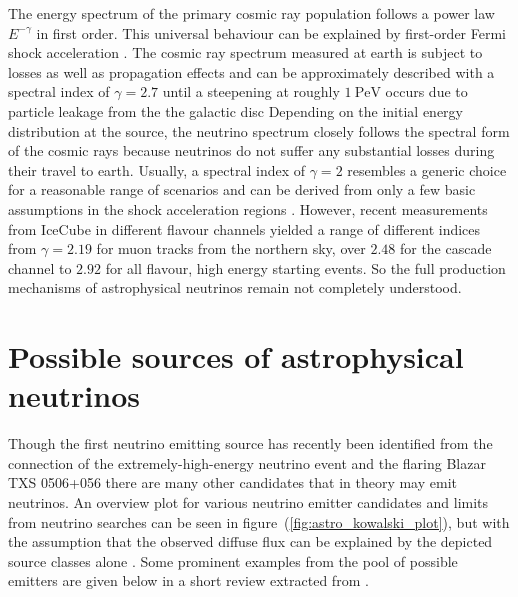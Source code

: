 The energy spectrum of the primary cosmic ray population follows a power law $E^{-\gamma}$ in first order.
This universal behaviour can be explained by first-order Fermi shock acceleration .
The cosmic ray spectrum measured at earth is subject to losses as well as propagation effects and can be approximately described with a spectral index of $\gamma=\num{2.7}$ until a steepening at roughly $\SI{1}{\peta\eV}$ occurs due to particle leakage from the the galactic disc 
Depending on the initial energy distribution at the source, the neutrino spectrum closely follows the spectral form of the cosmic rays because neutrinos do not suffer any substantial losses during their travel to earth.
Usually, a spectral index of $\gamma=2$ resembles a generic choice for a reasonable range of scenarios and can be derived from only a few basic assumptions in the shock acceleration regions .
However, recent measurements from IceCube in different flavour channels yielded a range of different indices from $\gamma=\num{2.19}$  for muon tracks from the northern sky, over $\num{2.48}$  for the cascade channel to $\num{2.92}$  for all flavour, high energy starting events.
So the full production mechanisms of astrophysical neutrinos remain not completely understood.

\section{Possible sources of astrophysical neutrinos}
Though the first neutrino emitting source has recently been identified from the connection of the extremely-high-energy neutrino event and the flaring Blazar TXS 0506+056  there are many other candidates that in theory may emit neutrinos.
An overview plot for various neutrino emitter candidates and limits from neutrino searches can be seen in figure~(\ref{fig:astro_kowalski_plot}), but with the assumption that the observed diffuse flux can be explained by the depicted source classes alone .
Some prominent examples from the pool of possible emitters are given below in a short review extracted from .

